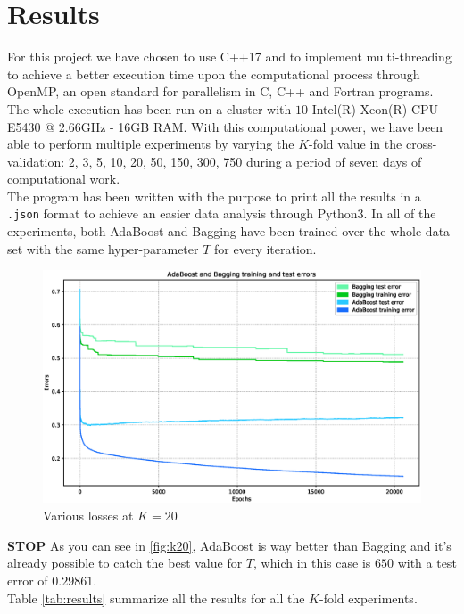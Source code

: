 
\chapter{Results}
For this project we have chosen to use C++17 and to implement multi-threading to achieve a better execution time upon the computational process through OpenMP, an open standard for parallelism in C, C++ and Fortran programs. The whole execution has been run on a cluster with $10$ Intel(R) Xeon(R) CPU E5430 @ 2.66GHz - 16GB RAM. With this computational power, we have been able to perform multiple experiments by varying the $K$-fold value in the cross-validation: 2, 3, 5, 10, 20, 50, 150, 300, 750 during a period of seven days of computational work.\\
The program has been written with the purpose to print all the results in a \texttt{.json} format to achieve an easier data analysis through Python3. In all of the experiments, both AdaBoost and Bagging have been trained over the whole data-set with the same hyper-parameter $T$ for every iteration.\\
\begin{figure}[htpb]
	\centering
	\includegraphics[scale=0.35]{figs/report_k20.eps}
	\caption{Various losses at $K = 20$}
	\label{fig:k20}
\end{figure}
\textbf{STOP}
As you can see in \autoref{fig:k20}, AdaBoost is way better than Bagging and it's already possible to catch the best value for $T$, which in this case is $650$ with a test error of $0.29861$.\\
Table \autoref{tab:results} summarize all the results for all the $K$-fold experiments.

